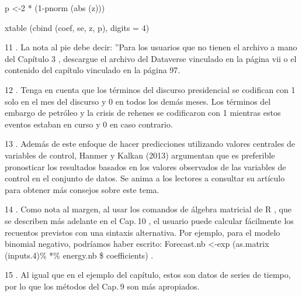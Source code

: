 \documentclass[
]{book}
\begin{document}
p \textless-2 * (1-pnorm (abs (z)))

xtable (cbind (coef, se, z, p), digits = 4)

11 .
La nota al pie debe decir: ''Para los usuarios que no tienen el archivo a mano del Capítulo 3 , descargue el archivo del Dataverse vinculado en la página vii o el contenido del capítulo vinculado en la página 97.

12 .
Tenga en cuenta que los términos del discurso presidencial se codifican con 1 solo en el mes del discurso y 0 en todos los demás meses. Los términos del embargo de petróleo y la crisis de rehenes se codificaron con 1 mientras estos eventos estaban en curso y 0 en caso contrario.

13 .
Además de este enfoque de hacer predicciones utilizando valores centrales de variables de control, Hanmer y Kalkan (2013) argumentan que es preferible pronosticar los resultados basados \hspace{0pt}\hspace{0pt}en los valores observados de las variables de control en el conjunto de datos. Se anima a los lectores a consultar su artículo para obtener más consejos sobre este tema.

14 .
Como nota al margen, al usar los comandos de álgebra matricial de R , que se describen más adelante en el Cap. 10 , el usuario puede calcular fácilmente los recuentos previstos con una sintaxis alternativa. Por ejemplo, para el modelo binomial negativo, podríamos haber escrito: Forecast.nb \textless-exp (as.matrix (inputs.4)\% *\% energy.nb \$ coefficients) .

15 .
Al igual que en el ejemplo del capítulo, estos son datos de series de tiempo, por lo que los métodos del Cap. 9 son más apropiados.
\end{document}
